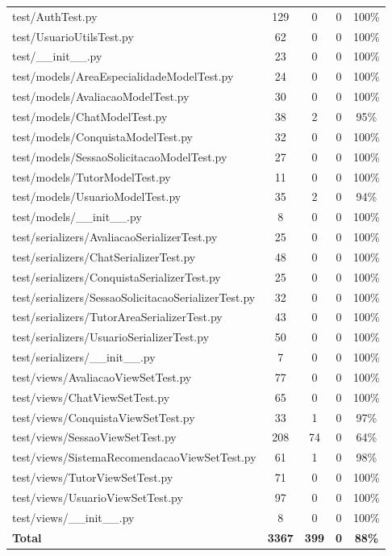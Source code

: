 \begin{landscape}
\begin{longtable}{lcccc}
    test/AuthTest.py & 129 & 0 & 0 & 100\% \\
    test/UsuarioUtilsTest.py & 62 & 0 & 0 & 100\% \\
    test/\_\_init\_\_.py & 23 & 0 & 0 & 100\% \\
    test/models/AreaEspecialidadeModelTest.py & 24 & 0 & 0 & 100\% \\
    test/models/AvaliacaoModelTest.py & 30 & 0 & 0 & 100\% \\
    test/models/ChatModelTest.py & 38 & 2 & 0 & 95\% \\
    test/models/ConquistaModelTest.py & 32 & 0 & 0 & 100\% \\
    test/models/SessaoSolicitacaoModelTest.py & 27 & 0 & 0 & 100\% \\
    test/models/TutorModelTest.py & 11 & 0 & 0 & 100\% \\
    test/models/UsuarioModelTest.py & 35 & 2 & 0 & 94\% \\
    test/models/\_\_init\_\_.py & 8 & 0 & 0 & 100\% \\
    test/serializers/AvaliacaoSerializerTest.py & 25 & 0 & 0 & 100\% \\
    test/serializers/ChatSerializerTest.py & 48 & 0 & 0 & 100\% \\
    test/serializers/ConquistaSerializerTest.py & 25 & 0 & 0 & 100\% \\
    test/serializers/SessaoSolicitacaoSerializerTest.py & 32 & 0 & 0 & 100\% \\
    test/serializers/TutorAreaSerializerTest.py & 43 & 0 & 0 & 100\% \\
    test/serializers/UsuarioSerializerTest.py & 50 & 0 & 0 & 100\% \\
    test/serializers/\_\_init\_\_.py & 7 & 0 & 0 & 100\% \\
    test/views/AvaliacaoViewSetTest.py & 77 & 0 & 0 & 100\% \\
    test/views/ChatViewSetTest.py & 65 & 0 & 0 & 100\% \\
    test/views/ConquistaViewSetTest.py & 33 & 1 & 0 & 97\% \\
    test/views/SessaoViewSetTest.py & 208 & 74 & 0 & 64\% \\
    test/views/SistemaRecomendacaoViewSetTest.py & 61 & 1 & 0 & 98\% \\
    test/views/TutorViewSetTest.py & 71 & 0 & 0 & 100\% \\
    test/views/UsuarioViewSetTest.py & 97 & 0 & 0 & 100\% \\
    test/views/\_\_init\_\_.py & 8 & 0 & 0 & 100\% \\
    \midrule
    \textbf{Total} & \textbf{3367} & \textbf{399} & \textbf{0} & \textbf{88\%} \\
    \bottomrule
\end{longtable}
\end{landscape}
\terminarCabecalhoTabelaPaisagem

